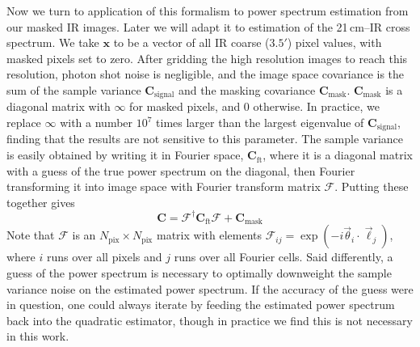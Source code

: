 \documentclass[numberedappendix]{emulateapj}
\newcommand{\Cb}{\mathbf{C}}
\newcommand{\xb}{\mathbf{x}}
\begin{document}
Now we turn to application of this formalism to power spectrum estimation from our masked IR images. Later we will adapt it to estimation of the 21\,cm--IR cross spectrum. We take $\xb$ to be a vector of all IR coarse ($3.5'$) pixel values, with masked pixels set to zero. After gridding the high resolution images to reach this resolution, photon shot noise is negligible, and the image space covariance is the sum of the sample variance $\Cb_\text{signal}$ and the masking covariance $\Cb_\text{mask}$. $\Cb_\text{mask}$ is a diagonal matrix with $\infty$ for masked pixels, and 0 otherwise. In practice, we replace $\infty$ with a number $10^7$ times larger than the largest eigenvalue of $\Cb_\text{signal}$, finding that the results are not sensitive to this parameter. The sample variance is easily obtained by writing it in Fourier space, $\Cb_\text{ft}$, where it is a diagonal matrix with a guess of the true power spectrum on the diagonal, then Fourier transforming it into image space with Fourier transform matrix $\mathcal{F}$. Putting these together gives
\begin{equation}
\label{eqn:covFTwithmask}
	\Cb = \mathcal{F}^\dagger\Cb_\text{ft}\mathcal{F}+\Cb_\text{mask}
\end{equation}
Note that $\mathcal{F}$ is an $N_\text{pix}\times N_\text{pix}$ matrix with elements $\mathcal{F}_{ij}=\exp(-i \vec{\theta}_i\cdot\vec{\ell}_j)$, where $i$ runs over all pixels and $j$ runs over all Fourier cells. Said differently, a guess of the power spectrum is necessary to optimally downweight the sample variance noise on the estimated power spectrum. If the accuracy of the guess were in question, one could always iterate by feeding the estimated power spectrum back into the quadratic estimator, though in practice we find this is not necessary in this work.
\end{document}
